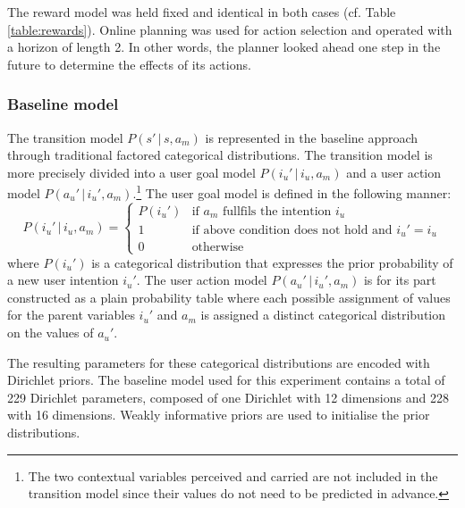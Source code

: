 The reward model was held fixed and identical in both cases (cf. Table \ref{table:rewards}). Online planning was used for action selection and operated with a horizon of length 2. In other words, the planner looked ahead one step in the future to determine the effects of its actions.  




\subsubsection*{Baseline model}

The transition model $P(s'\, | \, s, a_m)$ is represented in the baseline approach through traditional factored categorical distributions. The transition model is more precisely divided into a user goal model $P(i_u'\, | \, i_u, a_m)$ and a user action model $P(a_u' \, | \, i_u',a_m)$.\footnote{The two contextual variables $\mathrm{perceived}$ and $\mathrm{carried}$ are not included in the transition model since their values do not need to be predicted in advance.} The user goal model is defined in the following manner:
\begin{equation}
P(i_u' \, | \, i_u, a_m) = \begin{cases}
P(i_u') & \text{if } a_m \text{ fullfils the intention } i_u \\
1 & \text{if above condition does not hold and } i_u' = i_u \\
0 & \text{otherwise} \end{cases} \nonumber
\end{equation}
where $P(i_u')$ is a categorical distribution that expresses the prior probability of a new user intention $i_u'$. The user action model $P(a_u' \, | \, i_u',a_m)$ is for its part constructed as a plain probability table where each possible assignment of values for the parent variables $i_u'$ and $a_m$ is assigned a distinct categorical distribution on the values of $a_u'$. 

The resulting parameters for these categorical distributions are encoded with Dirichlet priors.  The baseline model used for this experiment contains a total of 229 Dirichlet parameters, composed of one Dirichlet with 12 dimensions and 228 with 16 dimensions.  Weakly informative priors are used to initialise the prior distributions.

